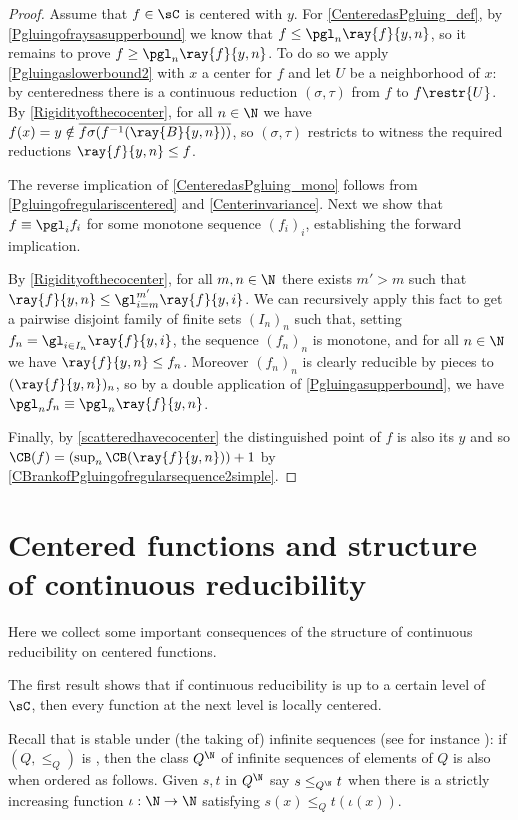 \begin{proof}
Assume that $f\in \sC$ is centered with \cocenter{} $y$.
For \cref{CenteredasPgluing_def}, by \cref{Pgluingofraysasupperbound} we know that $f\leq\pgl_n\ray{f}{y,n}$, so it remains to prove $f\geq\pgl_n\ray{f}{y,n}$.
To do so we apply \cref{Pgluingaslowerbound2} with $x$ a center for $f$ and let $U$ be a neighborhood of $x$: by centeredness there is a continuous reduction $(\sigma,\tau)$ from $f$ to $f\restr{U}$.
By \cref{Rigidityofthecocenter}, for all $n\in\N$ we have $f(x)=y\notin\overline{f\sigma(f^{-1}(\ray{B}{y,n}))}$, so $(\sigma,\tau)$ restricts to witness the required reductions $\ray{f}{y,n}\leq f$.

\smallskip

The reverse implication of \cref{CenteredasPgluing_mono} follows from \cref{Pgluingofregulariscentered} and \cref{Centerinvariance}.
Next we show that $f\equiv \pgl_i f_i$ for some monotone sequence $(f_i)_i$, establishing the forward implication.

By \cref{Rigidityofthecocenter}, for all $m,n\in\N$ there exists $m'>m$ such that $\ray{f}{y,n}\leq \gl_{i=m}^{m'}\ray{f}{y,i}$.
We can recursively apply this fact to get a pairwise disjoint family of finite sets $(I_n)_n$ such that, setting $f_n=\gl_{i\in I_n}\ray{f}{y,i}$,
the sequence $(f_n)_n$ is monotone, and for all $n\in\N$ we have $\ray{f}{y,n}\leq f_n$.
Moreover $(f_n)_n$ is clearly reducible by pieces to $(\ray{f}{y,n})_n$, so by a double application of \cref{Pgluingasupperbound}, we have $\pgl_nf_n\equiv\pgl_n\ray{f}{y,n}$. 

\smallskip

Finally, by \cref{scatteredhavecocenter} the distinguished point of $f$ is also its \cocenter{} $y$ and so $\CB(f)=(\sup_n \CB(\ray{f}{y,n})) +1$ by \cref{CBrankofPgluingofregularsequence2simple}.
\end{proof}


\section{Centered functions and structure of continuous reducibility}

Here we collect some important consequences of the structure of continuous reducibility on centered functions.

The first result shows that if continuous reducibility is \bqo{} up to a certain level of $\sC$, then every function at the next level is locally centered.

Recall that \bqo{} is stable under (the taking of) infinite sequences (see for instance \cite[Theorem 3.18]{wellbetterinbetween}):
if $(Q,\leq_Q)$ is \bqo{}, then the class $Q^\N$ of infinite sequences of elements of $Q$ is also \bqo{} when ordered as follows.
Given $s,t$ in $Q^\N$ say $s\leq_{Q^\N}t$ when there is a strictly increasing function $\iota:\N\to\N$ satisfying $s(x)\leq_Qt(\iota(x))$.

